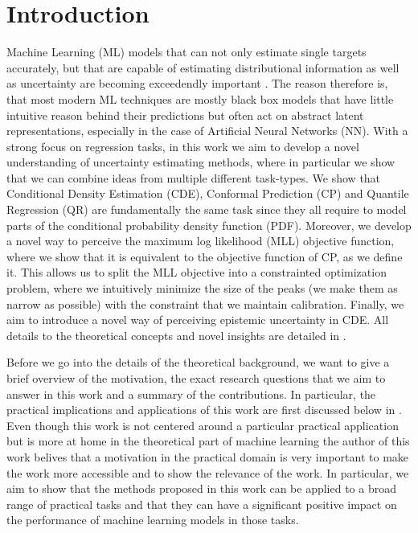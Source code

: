 
\chapter{Introduction}\label{chap:introduction}

Machine Learning (ML) models that can not only estimate single targets accurately, but that are capable of estimating distributional information as well as uncertainty are becoming exceedendly important \cite{hullermeier_aleatoric_2021, gawlikowski2023survey}. The reason therefore is, that most modern ML techniques are mostly black box models that have little intuitive reason behind their predictions but often act on abstract latent representations, especially in the case of Artificial Neural Networks (NN). With a strong focus on regression tasks, in this work we aim to develop a novel understanding of uncertainty estimating methods, where in particular we show that we can combine ideas from multiple different task-types. We show that Conditional Density Estimation (CDE), Conformal Prediction (CP) and Quantile Regression (QR) are fundamentally the same task since they all require to model parts of the conditional probability density function (PDF). Moreover, we develop a novel way to perceive the maximum log likelihood (MLL) objective function, where we show that it is equivalent to the objective function of CP, as we define it. This allows us to split the MLL objective into a constrainted optimization problem, where we intuitively minimize the size of the peaks (we make them as narrow as possible) with the constraint that we maintain calibration. Finally, we aim to introduce a novel way of perceiving epistemic uncertainty in CDE. All details to the theoretical concepts and novel insights are detailed in .

Before we go into the details of the theoretical background, we want to give a brief overview of the motivation, the exact research questions that we aim to answer in this work and a summary of the contributions. In particular, the practical implications and applications of this work are first discussed below in . Even though this work is not centered around a particular practical application but is more at home in the theoretical part of machine learning the author of this work belives that a motivation in the practical domain is very important to make the work more accessible and to show the relevance of the work. In particular, we aim to show that the methods proposed in this work can be applied to a broad range of practical tasks and that they can have a significant positive impact on the performance of machine learning models in those tasks.

